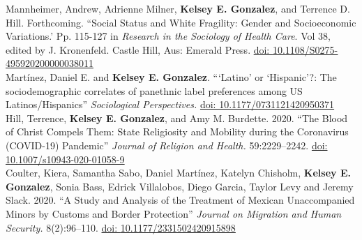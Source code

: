  Mannheimer, Andrew, Adrienne Milner, \textbf{Kelsey E. Gonzalez}, and Terrence D. Hill. Forthcoming. ``Social Status and White Fragility: Gender and Socioeconomic Variations.' Pp. 115-127 in \textit{Research in the Sociology of Health Care}. Vol 38, edited by J. Kronenfeld. Castle Hill, Aus: Emerald Press. \href{https://doi.org/10.1108/S0275-495920200000038011}{doi: \underline{10.1108/S0275-495920200000038011}} \\

 Martínez, Daniel E. and \textbf{Kelsey E. Gonzalez}. ```Latino' or `Hispanic'?: The sociodemographic correlates of panethnic label preferences among US Latinos/Hispanics''
\textit{Sociological Perspectives.} \href{https://doi.org/10.1177/0731121420950371}{doi:  \underline{10.1177/0731121420950371}} \\

  Hill, Terrence, \textbf{Kelsey E. Gonzalez}, and Amy M. Burdette. 2020. ``The Blood of Christ Compels Them: State Religiosity and Mobility during the Coronavirus (COVID-19) Pandemic''  
 \textit{Journal of Religion and Health.}  59:2229--2242.  \href{https://doi.org/10.1007/s10943-020-01058-9}{doi:  \underline{10.1007/s10943-020-01058-9}} \\

 Coulter, Kiera, Samantha Sabo, Daniel Martínez, Katelyn Chisholm, \textbf{Kelsey E. Gonzalez}, Sonia Bass, Edrick Villalobos, Diego Garcia, Taylor Levy and Jeremy Slack. 2020. ``A Study and Analysis of the Treatment of Mexican Unaccompanied Minors by Customs and Border Protection'' \textit{Journal on Migration and Human Security.} 8(2):96--110. 
\href{https://doi.org/10.1177/2331502420915898}{doi: \underline{10.1177/2331502420915898}} \\

